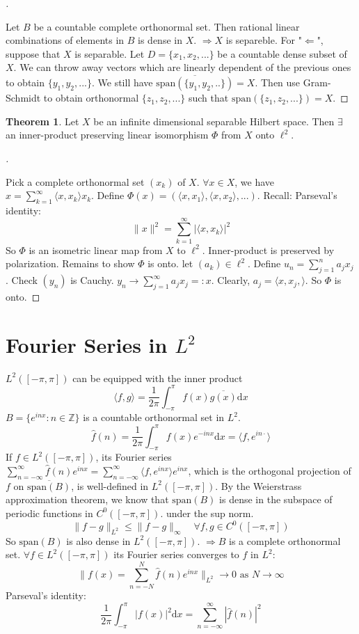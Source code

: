 \documentclass{article}
\theoremstyle{definition}
\newtheorem{thm}{Theorem}
\newenvironment{proofs}[1][\proofname]{%
  \begin{proof}[#1]$ $\par\nobreak\ignorespaces
}{%
  \end{proof}
}
\begin{document}
\begin{proofs}
	Let $B$ be a countable complete orthonormal set.
	Then rational linear combinations of elements in $B$ is dense in $X$.
	$\Rightarrow X$ is separeble.
	For "$\Leftarrow$", suppose that $X$ is separable.
	Let $D = \{x_1, x_2, ... \}$ be a countable dense subset of $X$.
	We can throw away vectors which are linearly dependent of the previous ones to obtain $\{y_1, y_2, ...\}$.
	We still have $\overline{\text{span}(\{y_1, y_2, ..\})} = X$.
	Then use Gram-Schmidt to obtain orthonormal $\{z_1, z_2, ...\}$ such that $\text{span}(\{z_1, z_2, ...\}) = X$.
\end{proofs}

\begin{thm}
	Let $X$ be an infinite dimensional separable Hilbert space.
	Then $\exists$ an inner-product preserving linear isomorphism $\Phi$ from $X$ onto $\ell^2$.
\end{thm}

\begin{proofs}
	Pick a complete orthonormal set $(x_k)$ of $X$.
	$\forall x \in X$, we have $x = \sum_{k = 1}^\infty \langle x, x_k \rangle x_k$.
	Define $\Phi(x) = (\langle x, x_1 \rangle, \langle x, x_2 \rangle, ...)$.
	Recall: Parseval's identity:
	\[
		\|x\|^2 = \sum_{k = 1}^\infty |\langle x, x_k \rangle|^2
	\]
	So $\Phi$ is an isometric linear map from $X$ to $\ell^2$.
	Inner-product is preserved by polarization.
	Remains to show $\Phi$ is onto.
	let $(a_k) \in \ell^2$.
	Define $u_n = \sum_{j = 1}^n a_j x_j$.
	Check $(y_n)$ is Cauchy.
	$y_n \to \sum_{j = 1}^\infty a_j x_j =: x$.
	Clearly, $a_j = \langle x, x_j, \rangle$.
	So $\Phi$ is onto.
\end{proofs}

\section{Fourier Series in $L^2$}

$L^2([-\pi, \pi])$ can be equipped with the inner product
\[
	\langle f, g \rangle = \frac{1}{2 \pi} \int_{- \pi}^\pi f(x) \overline{g(x)} \mathrm{d} x
\]
$B = \{e^{inx}: n \in \mathbb{Z}\}$ is a countable orthonormal set in $L^2$.
\[
	\hat{f}(n) = \frac{1}{2 \pi} \int_{- \pi}^\pi f(x) e^{-inx} \mathrm{d} x = \langle f, e^{i n \cdot} \rangle
\]
If $f \in L^2([-\pi, \pi])$, its Fourier series $\sum_{n = -\infty}^\infty \hat{f}(n) e^{inx} = \sum_{n = -\infty}^\infty \langle f, e^{inx} \rangle e^{inx}$, which is the orthogonal projection of $f$ on $\overline{\text{span}(B)}$, is well-defined in $L^2([-\pi, \pi])$.
By the Weierstrass approximation theorem, we know that $\text{span}(B)$ is dense in the subspace of periodic functions in $C^0([-\pi, \pi])$. under the sup norm.
\[
	\|f - g\|_{L^2} \leq \|f - g\|_{\infty} \quad \forall f, g \in C^0([-\pi, \pi])
\]
So $\text{span}(B)$ is also dense in $L^2([-\pi, \pi])$.
$\Rightarrow B$ is a complete orthonormal set.
$\forall f \in L^2([-\pi, \pi])$ its Fourier series converges to $f$ in $L^2$:
\[
	\|f(x) = \sum_{n = -N}^N \hat{f}(n) e^{inx}\|_{L^2} \to 0 \text{ as }N \to \infty
\]
Parseval's identity:
\[
	\frac{1}{2 \pi} \int_{- \pi}^\pi |f(x)|^2 \mathrm{d} x = \sum_{n = -\infty}^\infty |\hat{f}(n)|^2
\]
\end{document}
